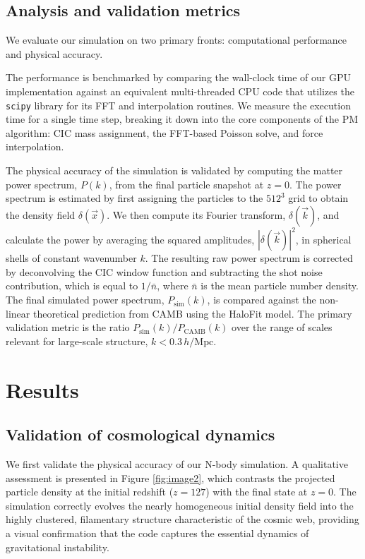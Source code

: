 \documentclass[]{article}
\begin{document}
\subsection{Analysis and validation metrics}

We evaluate our simulation on two primary fronts: computational performance and physical accuracy.

The performance is benchmarked by comparing the wall-clock time of our GPU implementation against an equivalent multi-threaded CPU code that utilizes the \texttt{scipy} library for its FFT and interpolation routines. We measure the execution time for a single time step, breaking it down into the core components of the PM algorithm: CIC mass assignment, the FFT-based Poisson solve, and force interpolation.

The physical accuracy of the simulation is validated by computing the matter power spectrum, $P(k)$, from the final particle snapshot at $z=0$. The power spectrum is estimated by first assigning the particles to the $512^3$ grid to obtain the density field $\delta(\vec{x})$. We then compute its Fourier transform, $\delta(\vec{k})$, and calculate the power by averaging the squared amplitudes, $|\delta(\vec{k})|^2$, in spherical shells of constant wavenumber $k$. The resulting raw power spectrum is corrected by deconvolving the CIC window function and subtracting the shot noise contribution, which is equal to $1/\bar{n}$, where $\bar{n}$ is the mean particle number density. The final simulated power spectrum, $P_{\text{sim}}(k)$, is compared against the non-linear theoretical prediction from CAMB using the HaloFit model. The primary validation metric is the ratio $P_{\text{sim}}(k) / P_{\text{CAMB}}(k)$ over the range of scales relevant for large-scale structure, $k < 0.3 \, h/\text{Mpc}$.

\section{Results}
\label{sec:results}
\subsection{Validation of cosmological dynamics}

We first validate the physical accuracy of our N-body simulation. A qualitative assessment is presented in Figure \ref{fig:image2}, which contrasts the projected particle density at the initial redshift ($z=127$) with the final state at $z=0$. The simulation correctly evolves the nearly homogeneous initial density field into the highly clustered, filamentary structure characteristic of the cosmic web, providing a visual confirmation that the code captures the essential dynamics of gravitational instability.
\end{document}
